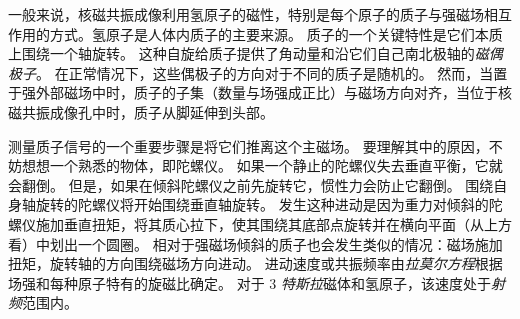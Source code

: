 一般来说，核磁共振成像利用氢原子的磁性，特别是每个原子的质子与强磁场相互作用的方式。氢原子是人体内质子的主要来源。
质子的一个关键特性是它们本质上围绕一个轴旋转。
这种自旋给质子提供了角动量和沿它们自己南北极轴的\textit{磁偶极子}。
在正常情况下，这些偶极子的方向对于不同的质子是随机的。
然而，当置于强外部磁场中时，质子的子集（数量与场强成正比）与磁场方向对齐，当位于核磁共振成像孔中时，质子从脚延伸到头部。



测量质子信号的一个重要步骤是将它们推离这个主磁场。
要理解其中的原因，不妨想想一个熟悉的物体，即陀螺仪。
如果一个静止的陀螺仪失去垂直平衡，它就会翻倒。
但是，如果在倾斜陀螺仪之前先旋转它，惯性力会防止它翻倒。
围绕自身轴旋转的陀螺仪将开始围绕垂直轴旋转。
发生这种进动是因为重力对倾斜的陀螺仪施加垂直扭矩，将其质心拉下，使其围绕其底部点旋转并在横向平面（从上方看）中划出一个圆圈。 
相对于强磁场倾斜的质子也会发生类似的情况：磁场施加扭矩，旋转轴的方向围绕磁场方向进动。
进动速度或共振频率由\textit{拉莫尔方程}根据场强和每种原子特有的旋磁比确定。 
对于 3 \textit{特斯拉}磁体和氢原子，该速度处于\textit{射频}范围内。



